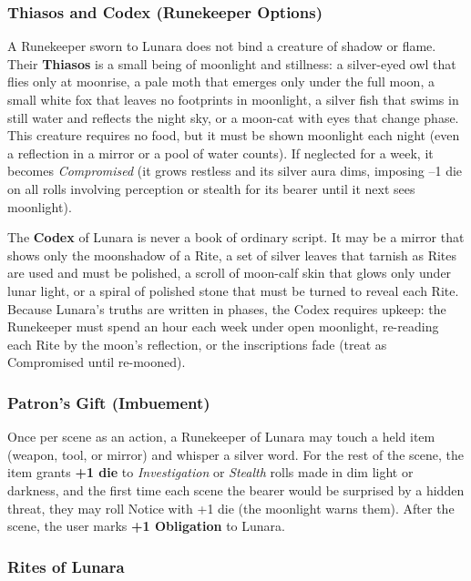 \subsubsection*{Thiasos and Codex (Runekeeper Options)}

A Runekeeper sworn to Lunara does not bind a creature of shadow or flame. Their \textbf{Thiasos} is a small being of moonlight and stillness: a silver-eyed owl that flies only at moonrise, a pale moth that emerges only under the full moon, a small white fox that leaves no footprints in moonlight, a silver fish that swims in still water and reflects the night sky, or a moon-cat with eyes that change phase. This creature requires no food, but it must be shown moonlight each night (even a reflection in a mirror or a pool of water counts). If neglected for a week, it becomes \textit{Compromised} (it grows restless and its silver aura dims, imposing --1 die on all rolls involving perception or stealth for its bearer until it next sees moonlight).

The \textbf{Codex} of Lunara is never a book of ordinary script. It may be a mirror that shows only the moonshadow of a Rite, a set of silver leaves that tarnish as Rites are used and must be polished, a scroll of moon-calf skin that glows only under lunar light, or a spiral of polished stone that must be turned to reveal each Rite. Because Lunara's truths are written in phases, the Codex requires upkeep: the Runekeeper must spend an hour each week under open moonlight, re-reading each Rite by the moon's reflection, or the inscriptions fade (treat as Compromised until re-mooned).

\subsubsection*{Patron's Gift (Imbuement)}

Once per scene as an action, a Runekeeper of Lunara may touch a held item (weapon, tool, or mirror) and whisper a silver word. For the rest of the scene, the item grants \textbf{+1 die} to \textit{Investigation} or \textit{Stealth} rolls made in dim light or darkness, and the first time each scene the bearer would be surprised by a hidden threat, they may roll Notice with +1 die (the moonlight warns them). After the scene, the user marks \textbf{+1 Obligation} to Lunara.

\subsubsection*{Rites of Lunara}

